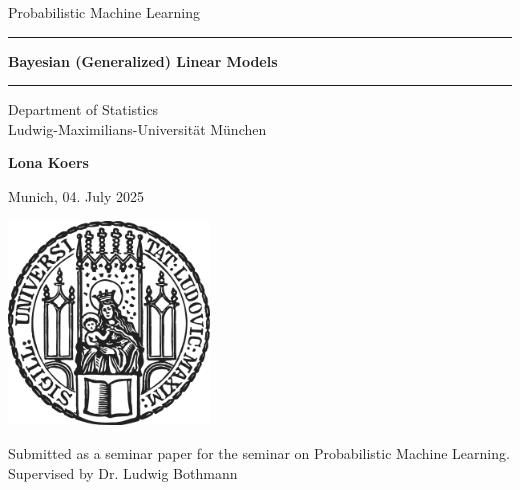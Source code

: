 \documentclass[12pt]{article}
\newcommand{\mytitle}{Bayesian (Generalized) Linear Models}
\newcommand{\myname}{Lona Koers}
\newcommand{\mysupervisor}{Dr. Ludwig Bothmann}
\begin{document}

\begin{titlepage}
\begin{center}

\LARGE
Probabilistic Machine Learning

\vspace{0.5cm}

\rule{\textwidth}{1.5pt}
\LARGE
\textbf{\mytitle}
\rule{\textwidth}{1.5pt}

\vspace{0.5cm}

\large
Department of Statistics \\
Ludwig-Maximilians-Universität München

\vfill

\Large
\textbf{\myname}

\vfill

\large
Munich, 04. July 2025

\vfill

\includegraphics[width = 0.4\textwidth]{sigillum.png}

\vfill

\normalsize
Submitted as a seminar paper for the seminar on Probabilistic Machine Learning.
\\

Supervised by \mysupervisor

\end{center}
\end{titlepage}


\newpage
\end{document}
